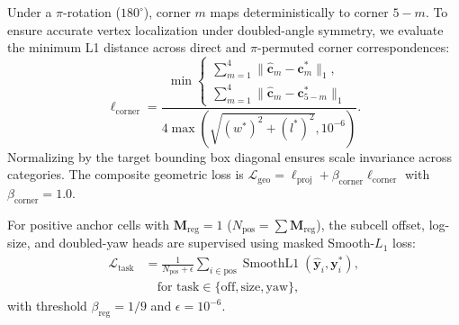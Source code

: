 \par{}\noindent
Under a $\pi$-rotation ($180^\circ$), corner $m$ maps deterministically to corner $5-m$. To ensure accurate vertex localization under doubled-angle symmetry, we evaluate the minimum L1 distance across direct and $\pi$-permuted corner correspondences:
\begin{equation}
    \ell_{\mathrm{corner}} = \frac{\min\left\{
        \begin{array}{l}
            \displaystyle\sum_{m=1}^4 \|\widehat{\mathbf{c}}_m - \mathbf{c}_m^*\|_1, \\
            \displaystyle\sum_{m=1}^4 \|\widehat{\mathbf{c}}_m - \mathbf{c}_{5-m}^*\|_1
        \end{array}
    \right.}{4\max\left(\sqrt{(w^*)^2 + (l^*)^2}, 10^{-6}\right)}.
    \label{eq:corner_loss}
\end{equation}
Normalizing by the target bounding box diagonal ensures scale invariance across categories. The composite geometric loss is $\mathcal{L}_{\mathrm{geo}} = \ell_{\mathrm{proj}} + \beta_{\mathrm{corner}} \ell_{\mathrm{corner}}$ with $\beta_{\mathrm{corner}} = 1.0$.

For positive anchor cells with $\mathbf{M}_{\mathrm{reg}} = 1$ ($N_{\mathrm{pos}} = \sum \mathbf{M}_{\mathrm{reg}}$), the subcell offset, log-size, and doubled-yaw heads are supervised using masked Smooth-$L_1$ loss:
\begin{equation}
    \begin{aligned}
        \mathcal{L}_{\mathrm{task}} &= \frac{1}{N_{\mathrm{pos}} + \epsilon} \sum_{i \in \mathrm{pos}} \operatorname{SmoothL1}(\hat{\mathbf{y}}_i, \mathbf{y}_i^*), \\
        &\quad \text{for } \mathrm{task} \in \{\mathrm{off}, \mathrm{size}, \mathrm{yaw}\},
    \end{aligned}
    \label{eq:smooth_l1_base}
\end{equation}
with threshold $\beta_{\mathrm{reg}} = 1/9$ and $\epsilon = 10^{-6}$.

